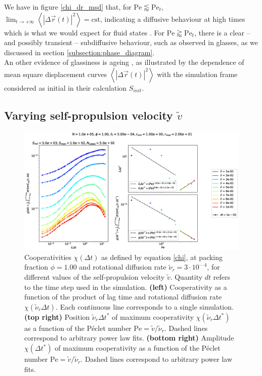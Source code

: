 \documentclass[class=report, float=false, crop=false]{standalone}
\begin{document}
We have in figure \ref{chi_dr_msd} that, for $\text{Pe} \lessapprox \text{Pe}_t$, $\lim_{t \rightarrow +\infty} \left<|\Delta\vec{r}(t)|^2\right> = \text{cst}$, indicating a diffusive behaviour at high times which is what we would expect for fluid states \cite{binder2011glassy}. For $\text{Pe} \gtrapprox \text{Pe}_t$, there is a clear -- and possibly transient -- subdiffusive behaviour, such as observed in glasses, as we discussed in section \ref{subsection:phase_diagram}.\\

An other evidence of glassiness is ageing \cite{courtland2002direct}, as illustrated by the dependence of mean square displacement curves $\left<|\Delta\vec{r}(t)|^2\right>$ with the simulation frame considered as initial in their calculation $S_{init}$.

\subsection{Varying self-propulsion velocity $\tilde{v}$}

\begin{figure}[h!]
\centering
\includegraphics[width=\textwidth]{figures/figs/intCuu_Dk8000_Rh3000_Nq1000_Io5000_Mn1000_Cn5000_RMINl1000_RMAXm2000.eps}
\caption{Cooperativities $\chi(\Delta t)$ as defined by equation \ref{chi}, at packing fraction $\phi = 1.00$ and rotational diffusion rate $\tilde{\nu}_r = 3\cdot10^{—4}$, for different values of the self-propulsion velocity $\tilde{v}$. Quantity $dt$ refers to the time step used in the simulation. \textbf{(left)} Cooperativity as a function of the product of lag time and rotational diffusion rate $\chi(\tilde{\nu}_r \Delta t)$. Each continuous line corresponds to a single simulation. \textbf{(top right)} Position $\tilde{\nu}_r \Delta t^*$ of maximum cooperativity $\chi(\tilde{\nu}_r \Delta t^*)$ as a function of the P\'eclet number $\text{Pe} = \tilde{v}/\tilde{\nu}_r$. Dashed lines correspond to arbitrary power law fits. \textbf{(bottom right)} Amplitude $\chi(\Delta t^*)$ of maximum cooperativity as a function of the P\'eclet number $\text{Pe} = \tilde{v}/\tilde{\nu}_r$. Dashed lines correspond to arbitrary power law fits.}
\label{chi_v}
\end{figure}
\end{document}
